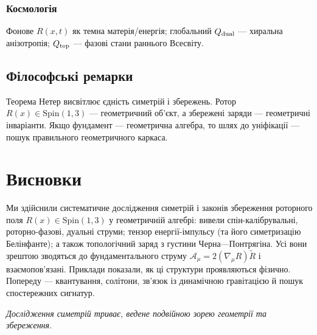 \documentclass[11pt,a4paper]{article}
\numberwithin{equation}{section}
\theoremstyle{plain}
\theoremstyle{definition}
\theoremstyle{remark}
\newif\ifack
\begin{document}
\subsubsection{Космологія}

Фонове $R(x,t)$ як темна матерія/енергія; глобальний $Q_{\rm dual}$ — хиральна анізотропія; $Q_{\rm top}$ — фазові стани раннього Всесвіту.

\subsection{Філософські ремарки}

Теорема Нетер висвітлює єдність симетрій і збережень. Ротор $R(x)\in \mathrm{Spin}(1,3)$ — геометричний об’єкт, а збережені заряди — геометричні інваріанти. Якщо фундамент — геометрична алгебра, то шлях до уніфікації — пошук правильного геометричного каркаса.

\section{Висновки}
\label{sec:conclusion}

Ми здійснили систематичне дослідження симетрій і законів збереження роторного поля $R(x)\in\mathrm{Spin}(1,3)$ у геометричній алгебрі: вивели спін-калібрувальні, роторно-фазові, дуальні струми; тензор енергії-імпульсу (та його симетризацію Белінфанте); а також топологічний заряд з густини Черна—Понтрягіна. Усі вони зрештою зводяться до фундаментального струму $\mathcal{A}_\mu=2(\nabla_\mu R)\widetilde{R}$ і взаємопов’язані. Приклади показали, як ці структури проявляються фізично. Попереду — квантування, солітони, зв’язок із динамічною гравітацією й пошук спостережних сигнатур.

\medskip
\noindent\textit{Дослідження симетрій триває, ведене подвійною зорею геометрії та збереження.}

\ifack
\section*{Подяки}
Автор завдячує Еммі Нетер, чия теорема вела покоління фізиків. Розвиток геометричної алгебри Девідом Гестенесом і її застосування до гравітації Ентоні Лазенбі, Крісом Дораном та Стівеном Галлом стали наріжними каменями. Корисними були розмови про нетерівські струми, спін-зв’язки та топологічні заряди. Роботу виконано незалежно, без зовнішнього фінансування. За можливі похибки відповідає автор.
\fi
\end{document}

